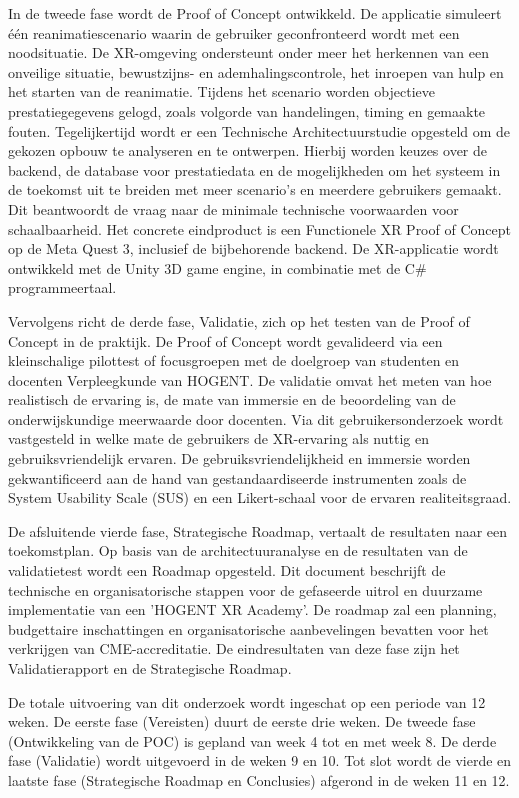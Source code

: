In de tweede fase wordt de Proof of Concept ontwikkeld. De applicatie simuleert één reanimatiescenario waarin de gebruiker geconfronteerd wordt met een noodsituatie. De XR-omgeving ondersteunt onder meer het herkennen van een onveilige situatie, bewustzijns- en ademhalingscontrole, het inroepen van hulp en het starten van de reanimatie. Tijdens het scenario worden objectieve prestatiegegevens gelogd, zoals volgorde van handelingen, timing en gemaakte fouten. Tegelijkertijd wordt er een Technische Architectuurstudie opgesteld om de gekozen opbouw te analyseren en te ontwerpen. Hierbij worden keuzes over de backend, de database voor prestatiedata en de mogelijkheden om het systeem in de toekomst uit te breiden met meer scenario's en meerdere gebruikers gemaakt. Dit beantwoordt de vraag naar de minimale technische voorwaarden voor schaalbaarheid. Het concrete eindproduct is een Functionele XR Proof of Concept op de Meta Quest 3, inclusief de bijbehorende backend. De XR-applicatie wordt ontwikkeld met de Unity 3D game engine, in combinatie met de C\# programmeertaal.

Vervolgens richt de derde fase, Validatie, zich op het testen van de Proof of Concept in de praktijk. De Proof of Concept wordt gevalideerd via een kleinschalige pilottest of focusgroepen met de doelgroep van studenten en docenten Verpleegkunde van HOGENT. De validatie omvat het meten van hoe realistisch de ervaring is, de mate van immersie en de beoordeling van de onderwijskundige meerwaarde door docenten. Via dit gebruikersonderzoek wordt vastgesteld in welke mate de gebruikers de XR-ervaring als nuttig en gebruiksvriendelijk ervaren.
De gebruiksvriendelijkheid en immersie worden gekwantificeerd aan de hand van gestandaardiseerde instrumenten zoals de System Usability Scale (SUS) en een Likert-schaal voor de ervaren realiteitsgraad.

De afsluitende vierde fase, Strategische Roadmap, vertaalt de resultaten naar een toekomstplan. Op basis van de architectuuranalyse en de resultaten van de validatietest wordt een Roadmap opgesteld. Dit document beschrijft de technische en organisatorische stappen voor de gefaseerde uitrol en duurzame implementatie van een 'HOGENT XR Academy'. De roadmap zal een planning, budgettaire inschattingen en organisatorische aanbevelingen bevatten voor het verkrijgen van CME-accreditatie. De eindresultaten van deze fase zijn het Validatierapport en de Strategische Roadmap.

De totale uitvoering van dit onderzoek wordt ingeschat op een periode van 12 weken. De eerste fase (Vereisten) duurt de eerste drie weken. De tweede fase (Ontwikkeling van de POC) is gepland van week 4 tot en met week 8. De derde fase (Validatie) wordt uitgevoerd in de weken 9 en 10. Tot slot wordt de vierde en laatste fase (Strategische Roadmap en Conclusies) afgerond in de weken 11 en 12.

